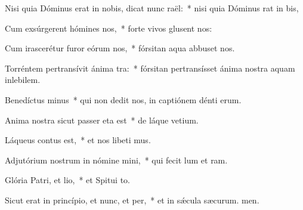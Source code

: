 \item Nisi quia Dóminus erat in nobis, dicat nunc raël:~* nisi quia Dóminus rat in bis,
\item Cum exsúrgerent hómines  nos,~* forte vivos glusent nos:
\item Cum irascerétur furor eórum  nos,~* fórsitan aqua abbuset nos.
\item Torréntem pertransívit ánima tra:~* fórsitan pertransísset ánima nostra aquam inlebilem.
\item Benedíctus minus~* qui non dedit nos, in captiónem dénti erum.
\item Anima nostra sicut passer eta est~* de láque vetium.
\item Láqueus contus est,~* et nos libeti mus.
\item Adjutórium nostrum in nómine mini,~* qui fecit lum et ram.
\item Glória Patri, et lio,~* et Spitui to.
\item Sicut erat in princípio, et nunc, et per,~* et in sǽcula sæcurum. men.
